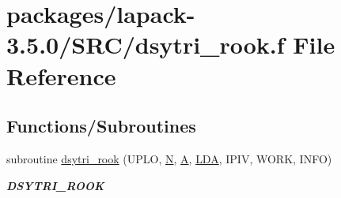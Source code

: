 \hypertarget{dsytri__rook_8f}{}\section{packages/lapack-\/3.5.0/\+S\+R\+C/dsytri\+\_\+rook.f File Reference}
\label{dsytri__rook_8f}
\subsection*{Functions/\+Subroutines}
\begin{DoxyCompactItemize}
\item 
subroutine \hyperlink{group__doubleSYcomputational_ga8d8bab61d20fb036b90f30180b06c3c3}{dsytri\+\_\+rook} (U\+P\+L\+O, \hyperlink{polmisc_8c_a0240ac851181b84ac374872dc5434ee4}{N}, \hyperlink{classA}{A}, \hyperlink{example__user_8c_ae946da542ce0db94dced19b2ecefd1aa}{L\+D\+A}, I\+P\+I\+V, W\+O\+R\+K, I\+N\+F\+O)
\begin{DoxyCompactList}\small\item\em {\bfseries D\+S\+Y\+T\+R\+I\+\_\+\+R\+O\+O\+K} \end{DoxyCompactList}\end{DoxyCompactItemize}
